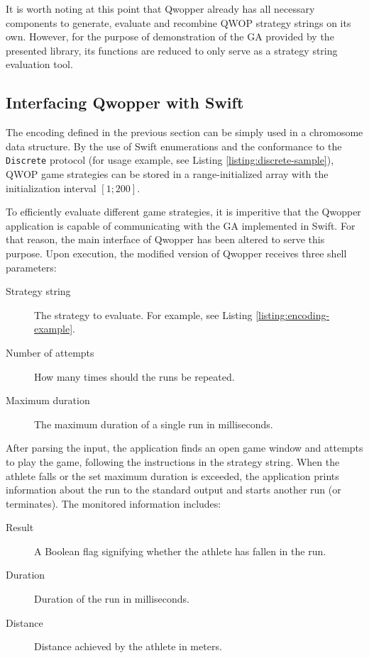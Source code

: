 It is worth noting at this point that Qwopper already has all necessary components to generate, evaluate and recombine QWOP strategy strings on its own. However, for the purpose of demonstration of the GA provided by the presented library, its functions are reduced to only serve as a strategy string evaluation tool.

\subsection{Interfacing Qwopper with Swift}
The encoding defined in the previous section can be simply used in a chromosome data structure. By the use of Swift enumerations and the conformance to the \texttt{Discrete} protocol (for usage example, see Listing \ref{listing:discrete-sample}), QWOP game strategies can be stored in a range-initialized array with the initialization interval $[1;200]$.

To efficiently evaluate different game strategies, it is imperitive that the Qwopper application is capable of communicating with the GA implemented in Swift. For that reason, the main interface of Qwopper has been altered to serve this purpose. Upon execution, the modified version of Qwopper receives three shell parameters:
~
\begin{description}
	\item[Strategy string]
	The strategy to evaluate. For example, see Listing \ref{listing:encoding-example}.

	\item[Number of attempts]
	How many times should the runs be repeated.

	\item[Maximum duration]
	The maximum duration of a single run in milliseconds.
\end{description}

After parsing the input, the application finds an open game window and attempts to play the game, following the instructions in the strategy string. When the athlete falls or the set maximum duration is exceeded, the application prints information about the run to the standard output and starts another run (or terminates). The monitored information includes:
~
\begin{description}
	\item[Result]
	A Boolean flag signifying whether the athlete has fallen in the run.

	\item[Duration]
	Duration of the run in milliseconds.

	\item[Distance]
	Distance achieved by the athlete in meters.
\end{description}

